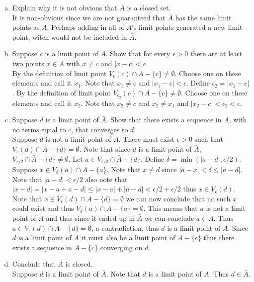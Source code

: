 \documentclass[12pt]{article}
\theoremstyle{homework}
\begin{document}
\begin{enumerate}[(a)]
\item
Explain why it is not obvious that $\bar{A}$ is a closed set.\\
It is non-obvious since we are not guaranteed that $\bar{A}$ has the same limit points as $A$.  Perhaps adding in all of $A$'s limit points generated a new limit point, witch would not be included in $\bar{A}$.
\item
Suppose $c$ is a limit point of $A$. Show that for every $\epsilon > 0$ there are at least two
points $x\in A$ with $x\neq c$ and $|x - c| <\epsilon$.\\
By the definition of limit point $V_\epsilon(c)\cap A- \{c\}\neq \emptyset$.  Choose one on these elements and call it $x_1$.  Note that $x_1\neq c$ and $|x_1 - c| <\epsilon$.  Define $\epsilon_2=|x_1 - c|$.  By the definition of limit point $V_{\epsilon_2}(c)\cap A- \{c\}\neq \emptyset$.  Choose one on these elements and call it $x_2$.  Note that $x_2\neq c$ and $x_2\neq x_1$ and $|x_2 - c| <\epsilon_2<\epsilon$.
\item
Suppose $d$ is a limit point of $\bar{A}$. Show that there exists a sequence in $A$, with no
terms equal to $c$, that converges to $d$.\\
Suppose $d$ is not a limit point of $A$.  There must exist $\epsilon>0$ such that $V_\epsilon(d)\cap A-\{d\}=\emptyset$.  Note that since $d$ is a limit point of $\bar{A}$, $V_{\epsilon/2}\cap \bar{A}-\{d\}\neq\emptyset$.  Let $a\in V_{\epsilon/2}\cap \bar{A}-\{d\}$.  Define $\delta=\min(|a-d|,\epsilon/2)$.  Suppose $x\in V_\delta(a)\cap A-\{a\}$.  Note that $x\neq d$ since $|a-x|<\delta\leq |a-d|$.  Note that $|a-d|<\epsilon/2$ also note that $|x-d|=|x-a+a-d|\leq |x-a|+|a-d|<\epsilon/2+\epsilon/2$ thus $x\in V_\epsilon(d)$.  Note that $x\in V_\epsilon(d)\cap A-\{d\}=\emptyset$ we can now conclude that no such $x$ could exist and thus $V_\delta(a)\cap A-\{a\}=\emptyset$.  This means that $a$ is not a limit point of $A$ and thus since it ended up in $\bar{A}$ we can conclude $a\in A$.  Thus $a\in V_\epsilon(d)\cap A-\{d\}=\emptyset$, a contradiction, thus $d$ is a limit point of $A$.  Since $d$ is a limit point of $A$ it must also be a limit point of $A-\{c\}$ thus there exists a sequence in $A-\{c\}$ converging on $d$.
\item
Conclude that $\bar{A}$ is closed.\\
Suppose $d$ is a limit point of $\bar{A}$.  Note that $d$ is a limit point of $A$.  Thus $d\in\bar{A}$.
\end{enumerate}
\end{document}
